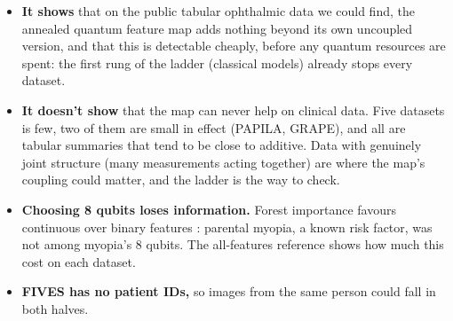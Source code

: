 \documentclass[11pt]{article}
\begin{document}
\begin{itemize}\setlength{\itemsep}{2pt}
\item \textbf{It shows} that on the public tabular ophthalmic data we could find, the annealed quantum feature
map adds nothing beyond its own uncoupled version, and that this is detectable cheaply, before any quantum
resources are spent: the first rung of the ladder (classical models) already stops every dataset.
\item \textbf{It doesn't show} that the map can never help on clinical data. Five datasets is few, two of them
are small in effect (PAPILA, GRAPE), and all are tabular summaries that tend to be close to additive. Data
with genuinely joint structure (many measurements acting together) are where the map's coupling could
matter, and the ladder is the way to check.
\item \textbf{Choosing 8 qubits loses information.} Forest importance favours continuous over binary features
\citep{Strobl2007}: parental myopia, a known risk factor, was not among myopia's 8 qubits. The all-features
reference shows how much this cost on each dataset.
\item \textbf{FIVES has no patient IDs,} so images from the same person could fall in both halves.
\end{itemize}
\end{document}
